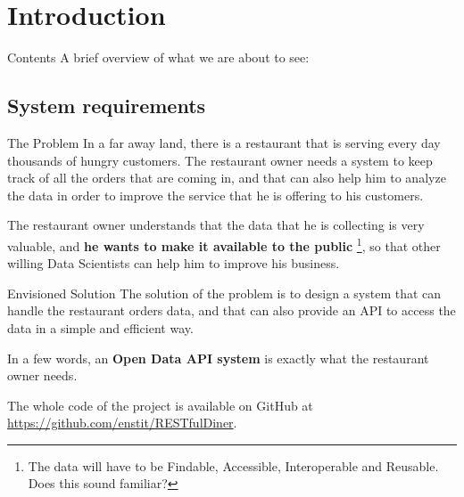 

\section[Introduction]{Introduction}

\begin{frame}{Contents}
	A brief overview of what we are about to see:
	\tableofcontents
\end{frame}

\subsection{System requirements}

\begin{frame}{The Problem}
	In a far away land, there is a restaurant that is serving every day
	thousands of hungry customers. The restaurant owner needs a system to keep
	track of all the orders that are coming in, and that can also help him to
	analyze the data in order to improve the service that he is offering to his
	customers.

	The restaurant owner understands that the data that he is collecting is very
	valuable, and \textbf{he wants to make it available to the public}%
	\footnote{The data will have to be Findable, Accessible, Interoperable and %
	Reusable. Does this sound familiar?}, so that other willing Data Scientists
	can help him to improve his business.
\end{frame}

\begin{frame}{Envisioned Solution}
	The solution of the problem is to design a system that can handle the
	restaurant orders data, and that can also provide an API to access the data
	in a simple and efficient way.

	In a few words, an \textbf{Open Data API system} is exactly what the
	restaurant owner needs.

	The whole code of the project is available on GitHub at
	\url{https://github.com/enstit/RESTfulDiner}.
\end{frame}



